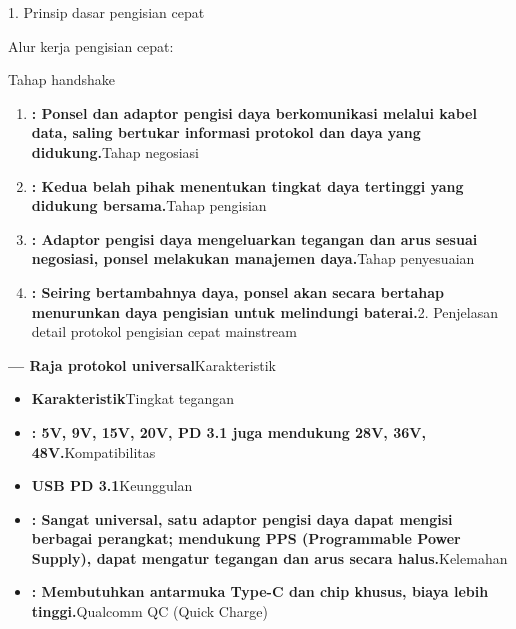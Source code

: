 
1. Prinsip dasar pengisian cepat


Alur kerja pengisian cepat:

Tahap handshake

\begin{enumerate}
  \item \textbf{: Ponsel dan adaptor pengisi daya berkomunikasi melalui kabel data, saling bertukar informasi protokol dan daya yang didukung.}Tahap negosiasi
  \item \textbf{: Kedua belah pihak menentukan tingkat daya tertinggi yang didukung bersama.}Tahap pengisian
  \item \textbf{: Adaptor pengisi daya mengeluarkan tegangan dan arus sesuai negosiasi, ponsel melakukan manajemen daya.}Tahap penyesuaian
  \item \textbf{: Seiring bertambahnya daya, ponsel akan secara bertahap menurunkan daya pengisian untuk melindungi baterai.}2. Penjelasan detail protokol pengisian cepat mainstream
\end{enumerate}


\textbf{— Raja protokol universal}Karakteristik

\begin{itemize}
  \item \textbf{Karakteristik}Tingkat tegangan
  \item \textbf{: 5V, 9V, 15V, 20V, PD 3.1 juga mendukung 28V, 36V, 48V.}Kompatibilitas
  \item \textbf{USB PD 3.1}Keunggulan
  \item \textbf{: Sangat universal, satu adaptor pengisi daya dapat mengisi berbagai perangkat; mendukung PPS (Programmable Power Supply), dapat mengatur tegangan dan arus secara halus.}Kelemahan
  \item \textbf{: Membutuhkan antarmuka Type-C dan chip khusus, biaya lebih tinggi.}Qualcomm QC (Quick Charge)
\end{itemize}

